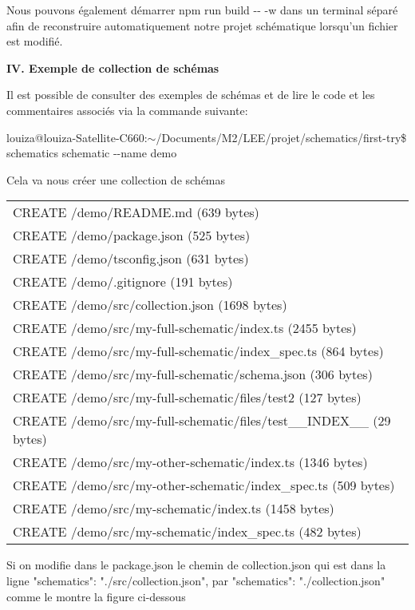 \documentclass[12pt,french]{article}
\begin{document}
	Nous pouvons également démarrer npm run build \--\-- -w dans un terminal séparé afin de reconstruire automatiquement notre projet schématique lorsqu'un fichier est modifié.\newpage
	
	\textbf{IV. Exemple de collection de schémas}\newline
	
	Il est possible de consulter des exemples  de schémas et de lire le code et les commentaires associés via la commande suivante:\newline
	
	louiza@louiza-Satellite-C660:$\sim$/Documents/M2/LEE/projet/schematics/first-try\$ schematics schematic \--\--name demo\newline
	
	Cela va nous créer une collection de schémas\newline
		
	\begin{tabular}{l}
		CREATE /demo/README.md (639 bytes)\\
		CREATE /demo/package.json (525 bytes)
\\
		CREATE /demo/tsconfig.json (631 bytes)
\\
		CREATE /demo/.gitignore (191 bytes)
\\
		CREATE /demo/src/collection.json (1698 bytes)\\
		CREATE /demo/src/my-full-schematic/index.ts (2455 bytes)
\\
		CREATE /demo/src/my-full-schematic/index\_spec.ts (864 bytes)\\
		CREATE /demo/src/my-full-schematic/schema.json (306 bytes)
\\
		CREATE /demo/src/my-full-schematic/files/test2 (127 bytes)
\\
		CREATE /demo/src/my-full-schematic/files/test\_\_INDEX\_\_ (29 bytes)\\
		CREATE /demo/src/my-other-schematic/index.ts (1346 bytes)
\\
		CREATE /demo/src/my-other-schematic/index\_spec.ts (509 bytes)\\
		CREATE /demo/src/my-schematic/index.ts (1458 bytes)
\\
		CREATE /demo/src/my-schematic/index\_spec.ts (482 bytes)\\
	\end{tabular}\newline

	Si on modifie dans le package.json le chemin de collection.json qui est dans la ligne
	"schematics": "./src/collection.json", par "schematics": "./collection.json" comme le montre la figure ci-dessous
	
\end{document}
